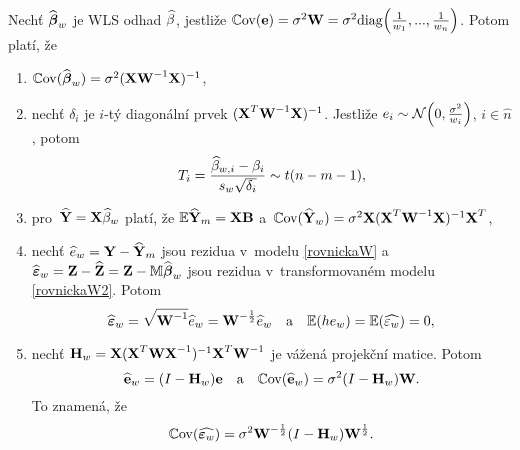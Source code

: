 \begin{theorem}
Nechť $\widehat{\boldsymbol{\beta}}_w$ je WLS odhad $\widehat{\beta}$, jestliže $\mathbb{C}\mathrm{ov}(\textbf{e}) = \sigma^2\textbf{W} = \sigma^2\mathrm{diag}\Big(\frac{1}{w_1},...,\frac{1}{w_n}\Big)$. Potom platí, že
\begin{enumerate}[1)]
	\item $\mathbb{C}\mathrm{ov}(\widehat{\boldsymbol{\beta}}_w) = \sigma^2{(\textbf{X}{\textbf{W}^{-1}}\textbf{X})^{-1}}$,
	\item nechť $\delta_i$ je $i$-tý diagonální prvek ${(\textbf{X}^T{\textbf{W}^{-1}}\textbf{X})^{-1}}$. Jestliže $e_i\sim \mathcal{N}\Big(0,\frac{\sigma^2}{w_i}\Big)$, $i\in\widehat{n}$, potom
	 $$ T_i = \frac{\widehat{\beta}_{w,i}-\beta_i}{s_w\sqrt{\delta_i}}\sim t(n-m-1), $$
	\item pro~$\widehat{\textbf{Y}} = \textbf{X}\widehat{\beta}_w$ platí, že $\mathbb{E} \widehat{\textbf{Y}}_m = \textbf{X}\textbf{B}$ a~$\mathbb{C}\mathrm{ov}(\widehat{\textbf{Y}}_w) = \sigma^2\textbf{X}{(\textbf{X}^T{\textbf{W}^{-1}}\textbf{X})^{-1}}\textbf{X}^T$,
\item nechť $\widehat{e}_w = \textbf{Y}-\widehat{\textbf{Y}}_m$ jsou rezidua v~modelu \ref{rovnickaW} a~$\widehat{\boldsymbol{\varepsilon}}_w = \textbf{Z}-\widehat{\textbf{Z}} = \textbf{Z}-\mathbb{M}\widehat{\boldsymbol{\beta}}_w$ jsou rezidua v~transformovaném modelu \ref{rovnickaW2}. Potom
 $$ \widehat{\boldsymbol{\varepsilon}}_w = \sqrt{{\textbf{W}^{-1}}}\widehat{e}_w = \textbf{W}^{-\frac{1}{2}}\widehat{e}_w\quad\text{a}\quad \mathbb{E}(he_w) = \mathbb{E}(\widehat{\varepsilon_w}) = 0, $$
\item nechť $\textbf{H}_w = \textbf{X}{(\textbf{X}^T{\textbf{W}\textbf{X}^{-1}})^{-1}}\textbf{X}^T{\textbf{W}^{-1}}$ je vážená projekční matice. Potom
 $$ \widehat{\textbf{e}}_w = (I-\textbf{H}_w)\textbf{e}\quad\text{a}\quad \mathbb{C}\mathrm{ov}(\widehat{\textbf{e}}_w) = \sigma^2(I-\textbf{H}_w)\textbf{W}. $$
To znamená, že $$ \mathbb{C}\mathrm{ov}(\widehat{\boldsymbol{\varepsilon}_w}) = \sigma^2\textbf{W}^{-\frac{1}{2}}(I-\textbf{H}_w)\textbf{W}^{\frac{1}{2}}. $$
\end{enumerate}


\end{theorem}
